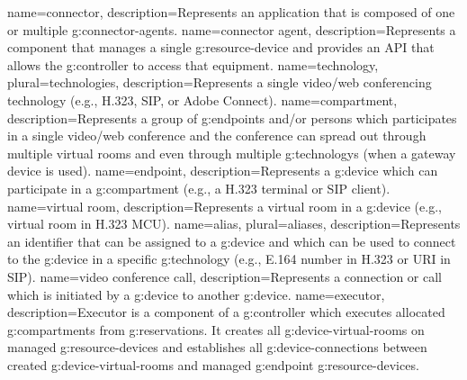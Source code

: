 {
  name=connector,
  description={Represents an application that is composed of one or multiple \glspl{g:connector-agent}.}
}
{
  name=connector agent,
  description={Represents a component that manages a single \gls{g:resource-device} 
    and provides an API that allows the \gls{g:controller} to access that equipment.}
}
{
  name=technology,
  plural=technologies,
  description={Represents a single video/web conferencing technology (e.g., 
    H.323, SIP, or Adobe Connect).}
}
{
  name=compartment,
  description={Represents a group of \glspl{g:endpoint} and/or persons which participates 
    in a single video/web conference and the conference can spread out through multiple 
    virtual rooms and even through multiple \glspl{g:technology} (when a gateway device is used).}
}
{
  name=endpoint,
  description={Represents a \gls{g:device} which can participate in a \gls{g:compartment} (e.g., a H.323 terminal or SIP client).}
}
{
  name=virtual room,
  description={Represents a virtual room in a \gls{g:device} (e.g., virtual room in H.323 MCU).}
}
{
  name=alias,
  plural=aliases,
  description={Represents an identifier that can be assigned to a \gls{g:device} and
    which can be used to connect to the \gls{g:device} in a specific \gls{g:technology} 
    (e.g., E.164 number in H.323 or URI in SIP).}
}
{
  name=video conference call,
  description={Represents a connection or call which is initiated by a 
    \gls{g:device} to another \gls{g:device}.}
}
{
  name=executor,
  description={Executor is a component of a \gls{g:controller} which executes
    allocated \glspl{g:compartment} from \glspl{g:reservation}. It creates
    all \glspl{g:device-virtual-room} on managed \glspl{g:resource-device} and
    establishes all \glspl{g:device-connection} between created 
    \glspl{g:device-virtual-room} and managed \gls{g:endpoint} 
    \glspl{g:resource-device}.}
}


\renewcommand*{\glossaryname}{List of Terms}  %
\renewcommand*{\glspostdescription}{}         %
\renewcommand*{\glsnamefont}[1]{\textbf{#1}}  %
\renewcommand*{\arraystretch}{1.4}            %
\renewcommand*\glossarypreamble{\addcontentsline{toc}{chapter}{\glossaryname}}
\setlength{\glspagelistwidth}{0.1\linewidth}
\setlength{}        %
\glsaddall                                    %
\renewcommand*{\glsgroupskip}{}               %
\printglossary[type=main]                     %


